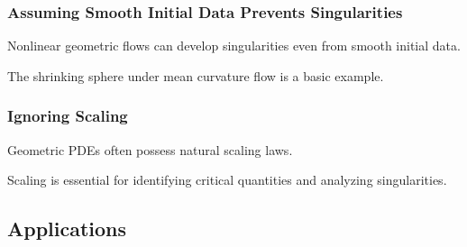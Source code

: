 \subsubsection{Assuming Smooth Initial Data Prevents Singularities}

Nonlinear geometric flows can develop singularities even from smooth
initial data.

The shrinking sphere under mean curvature flow is a basic example.

\subsubsection{Ignoring Scaling}

Geometric PDEs often possess natural scaling laws.

Scaling is essential for identifying critical quantities and analyzing
singularities.

\subsection{Applications}
\label{subsec:geometric-analysis-applications}

